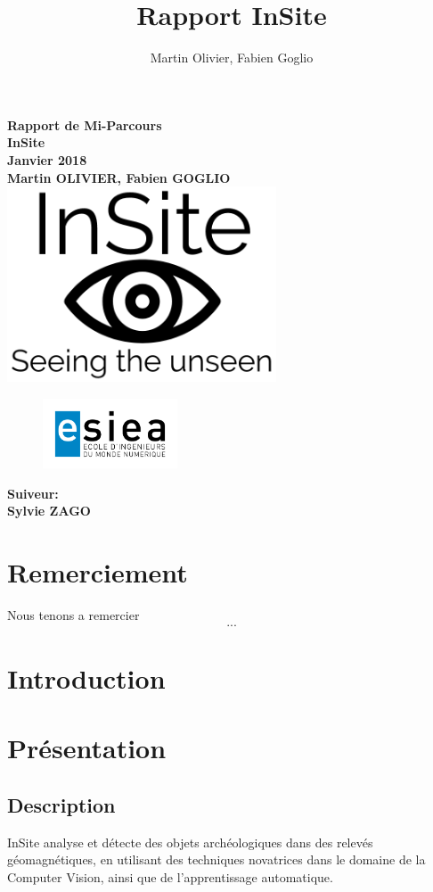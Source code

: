 \documentclass[a4paper, 12pt, titlepage, oneside, french]{article}
\author{Martin Olivier, Fabien Goglio}
\title{Rapport InSite}
\begin{document}
\begin{titlepage}
	\centering
		\vfill
		    {\bfseries\Large
			Rapport de Mi-Parcours\\
			InSite\\
			Janvier 2018\\
			\vskip2cm
			Martin OLIVIER, Fabien GOGLIO\\
		    }    
		\vfill
		\includegraphics[width=8cm]{Logo_Preview.png}
		\begin{figure}[b]
			\includegraphics[width=4cm]{Logo-ESIEA.jpg}

		\end{figure}
		\vfill
		\hfill {\bfseries\Large
		 Suiveur:\\
		 \hfill Sylvie ZAGO}
\end{titlepage}

\newpage
	\tableofcontents
\newpage
\cleardoublepage
{}
\section{Remerciement}
	Nous tenons a remercier \[...\]
	\newpage
\section{Introduction}
	
	\newpage
\section{Présentation}
	\subsection{Description}
		InSite analyse et détecte des objets archéologiques dans des relevés géomagnétiques, en utilisant des techniques novatrices dans le domaine de
		la Computer Vision, ainsi que de l'apprentissage automatique.
\end{document}
